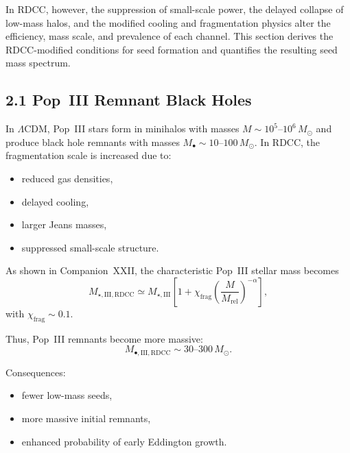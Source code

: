 \documentclass[11pt,a4paper]{article}
\begin{document}
In RDCC, however, the suppression of small-scale power, the delayed collapse of low-mass 
halos, and the modified cooling and fragmentation physics alter the efficiency, mass scale, 
and prevalence of each channel. This section derives the RDCC-modified conditions for seed 
formation and quantifies the resulting seed mass spectrum.

\subsection*{2.1 Pop~III Remnant Black Holes}

In $\Lambda$CDM, Pop~III stars form in minihalos with masses 
$M \sim 10^{5}$--$10^{6}\,M_{\odot}$ and produce black hole remnants with masses 
$M_{\bullet} \sim 10$--$100\,M_{\odot}$. In RDCC, the fragmentation scale is increased due to:

\begin{itemize}
    \item reduced gas densities,
    \item delayed cooling,
    \item larger Jeans masses,
    \item suppressed small-scale structure.
\end{itemize}

As shown in Companion~XXII, the characteristic Pop~III stellar mass becomes
\begin{equation}
    M_{\star,\mathrm{III,RDCC}}
    \simeq M_{\star,\mathrm{III}}
    \left[
        1 + \chi_{\mathrm{frag}}
        \left(\frac{M}{M_{\mathrm{rel}}}\right)^{-\alpha}
    \right],
\end{equation}
with $\chi_{\mathrm{frag}} \sim 0.1$.

Thus, Pop~III remnants become more massive:
\begin{equation}
    M_{\bullet,\mathrm{III,RDCC}}
    \sim 30\text{--}300\,M_{\odot}.
\end{equation}

Consequences:

\begin{itemize}
    \item fewer low-mass seeds,
    \item more massive initial remnants,
    \item enhanced probability of early Eddington growth.
\end{itemize}

\end{document}
